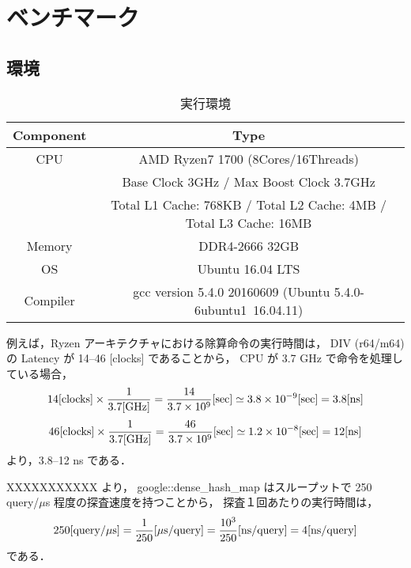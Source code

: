 \chapter{ベンチマーク}
\label{chap_Results}

\section{環境}

\begin{table}[hbtp]
  \begin{center}
    \caption{実行環境}
    \begin{tabular}{cc} \hline
      Component & Type \rule[0pt]{0pt}{0pt} \\ \hline
      CPU & AMD Ryzen7 1700 (8Cores/16Threads) \rule[0pt]{0pt}{0pt} \\ 
      & Base Clock 3GHz / Max Boost Clock 3.7GHz \rule[0pt]{0pt}{0pt} \\
      & Total L1 Cache: 768KB / Total L2 Cache: 4MB / Total L3 Cache: 16MB \\
      Memory & DDR4-2666 32GB \rule[0pt]{0pt}{0pt} \\
      OS & Ubuntu 16.04 LTS \rule[0pt]{0pt}{0pt} \\
      Compiler & gcc version 5.4.0 20160609 (Ubuntu 5.4.0-6ubuntu1~16.04.11) \rule[0pt]{0pt}{0pt} \\ \hline
    \end{tabular}
  \end{center}
  \label{table_env}
\end{table}


例えば，Ryzen アーキテクチャにおける除算命令の実行時間は，
DIV (r64/m64) の Latency が 14--46 [clocks] であることから\citep{AgnerFog2018}，
CPU が 3.7 GHz で命令を処理している場合，
\begin{align*}
14 {\rm [clocks]} \times \frac{1}{3.7 {\rm [GHz]}}
= \frac{14}{3.7 \times 10^9} {\rm [sec]}
\simeq 3.8 \times 10^{-9} {\rm [sec]}
= 3.8 {\rm [ns]}
\end{align*}
\begin{align*}
46 {\rm [clocks]} \times \frac{1}{3.7 {\rm [GHz]}}
= \frac{46}{3.7 \times 10^9} {\rm [sec]}
\simeq 1.2 \times 10^{-8} {\rm [sec]}
= 12 {\rm [ns]}
\end{align*}
より，3.8--12 ns である．



XXXXXXXXXXX より，
google::dense\_hash\_map はスループットで 250 query/$\mu$s 程度の探査速度を持つことから，
探査１回あたりの実行時間は，
\begin{align*}
  250{\rm [query \slash \mu s]}
  = \frac{1}{250} {\rm [\mu s \slash query]}
  = \frac{10^3}{250} {\rm [ns \slash query]}
  = 4 {\rm [ns \slash query]}
\end{align*}
である．

